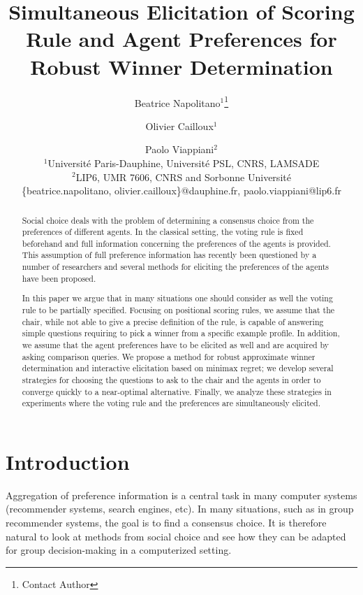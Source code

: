 \documentclass{article}
\title{Simultaneous Elicitation of Scoring Rule and Agent Preferences for Robust Winner Determination}
\author{
	Beatrice Napolitano$^1$\footnote{Contact Author}\and
	Olivier Cailloux$^1$\and
	Paolo Viappiani$^2$\\
	\affiliations
	$^1$Université Paris-Dauphine, Université PSL, CNRS, LAMSADE\\
	$^2$LIP6, UMR 7606, CNRS and Sorbonne Universit\'e\\
	\emails
	\{beatrice.napolitano, olivier.cailloux\}@dauphine.fr,
	paolo.viappiani@lip6.fr
}
\begin{document}
\maketitle 

\begin{abstract}
Social choice deals with the problem of determining a consensus choice from the preferences of different agents.
In the classical setting, the voting rule is fixed beforehand and full information concerning the preferences of the agents is provided.
This assumption of full preference information has recently been questioned by a number of researchers and
	several methods for eliciting the preferences of the agents have been proposed.

In this paper we argue that in many situations one should consider as well the voting rule to be 	partially specified.
	Focusing on positional scoring rules, we assume that the chair, while not able to give a precise definition of the rule, is capable of answering simple questions requiring to pick a winner from a specific example profile. In addition, we assume that the agent preferences have to be elicited as well and are acquired by asking comparison queries. 
	We propose a method for robust approximate winner determination and interactive elicitation based on minimax regret; we develop several strategies for choosing the questions to ask to  the chair and the agents in order to %
converge quickly to a near-optimal alternative. Finally, we analyze these strategies in experiments %
 where the voting rule and the preferences are simultaneously elicited.
\end{abstract}

\section{Introduction}
Aggregation of preference information is a central task in many computer systems (recommender systems, search engines, etc).
In many situations, such as in group recommender systems, the goal is to find a consensus choice.
It is therefore natural to look at methods from social choice and see how they can be adapted for group decision-making in a computerized setting.
\end{document}
